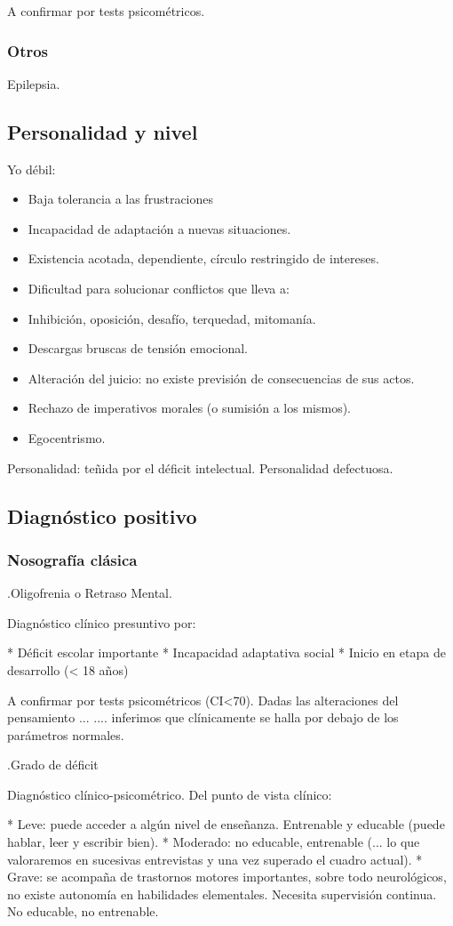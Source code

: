\documentclass{scrbook}
\begin{document}
A confirmar por tests psicométricos.
\subsubsection*{Otros}
Epilepsia.
\subsection*{Personalidad y nivel}
Yo débil:
\begin{itemize}
\item Baja tolerancia a las frustraciones
\item Incapacidad de adaptación a nuevas situaciones.
\item Existencia acotada, dependiente, círculo restringido de intereses.
\item Dificultad para solucionar conflictos que lleva a:
\item Inhibición, oposición, desafío, terquedad, mitomanía.
\item Descargas bruscas de tensión emocional.
\item Alteración del juicio: no existe previsión de consecuencias de sus actos.
\item Rechazo de imperativos morales (o sumisión a los mismos).
\item Egocentrismo.
\end{itemize}
Personalidad: teñida por el déficit intelectual. Personalidad defectuosa.
\subsection*{Diagnóstico positivo}
\subsubsection*{Nosografía clásica}
.Oligofrenia o Retraso Mental.

Diagnóstico clínico presuntivo por:

* Déficit escolar importante
* Incapacidad adaptativa social
* Inicio en etapa de desarrollo (< 18 años)

A confirmar por tests psicométricos (CI<70). Dadas las alteraciones del pensamiento ... .... inferimos que clínicamente se halla por debajo de los parámetros normales.

.Grado de déficit

Diagnóstico clínico-psicométrico. Del punto de vista clínico:

* Leve: puede acceder a algún nivel de enseñanza. Entrenable y educable (puede hablar, leer y escribir bien).
* Moderado: no educable, entrenable (... lo que valoraremos en sucesivas entrevistas y una vez superado el cuadro actual).
* Grave: se acompaña de trastornos motores importantes, sobre todo neurológicos, no existe autonomía en habilidades elementales. Necesita supervisión continua. No educable, no entrenable.
\end{document}
